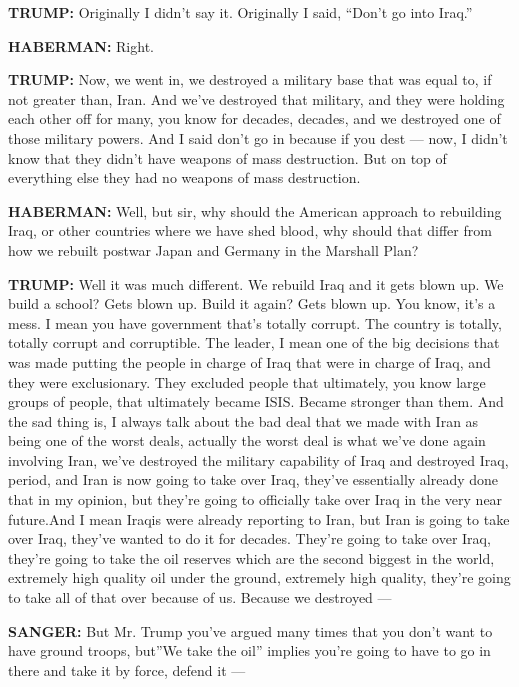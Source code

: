 \textbf{TRUMP:} Originally I didn't say it. Originally I said, ``Don't
go into Iraq.''

\textbf{HABERMAN:} Right.

\textbf{TRUMP:} Now, we went in, we destroyed a military base that was
equal to, if not greater than, Iran. And we've destroyed that military,
and they were holding each other off for many, you know for decades,
decades, and we destroyed one of those military powers. And I said don't
go in because if you dest --- now, I didn't know that they didn't have
weapons of mass destruction. But on top of everything else they had no
weapons of mass destruction.

\textbf{HABERMAN:} Well, but sir, why should the American approach to
rebuilding Iraq, or other countries where we have shed blood, why should
that differ from how we rebuilt postwar Japan and Germany in the
Marshall Plan?

\textbf{TRUMP:} Well it was much different. We rebuild Iraq and it gets
blown up. We build a school? Gets blown up. Build it again? Gets blown
up. You know, it's a mess. I mean you have government that's totally
corrupt. The country is totally, totally corrupt and corruptible. The
leader, I mean one of the big decisions that was made putting the people
in charge of Iraq that were in charge of Iraq, and they were
exclusionary. They excluded people that ultimately, you know large
groups of people, that ultimately became ISIS. Became stronger than
them. And the sad thing is, I always talk about the bad deal that we
made with Iran as being one of the worst deals, actually the worst deal
is what we've done again involving Iran, we've destroyed the military
capability of Iraq and destroyed Iraq, period, and Iran is now going to
take over Iraq, they've essentially already done that in my opinion, but
they're going to officially take over Iraq in the very near future.And I
mean Iraqis were already reporting to Iran, but Iran is going to take
over Iraq, they've wanted to do it for decades. They're going to take
over Iraq, they're going to take the oil reserves which are the second
biggest in the world, extremely high quality oil under the ground,
extremely high quality, they're going to take all of that over because
of us. Because we destroyed ---

\textbf{SANGER:} But Mr. Trump you've argued many times that you don't
want to have ground troops, but''We take the oil'' implies you're going
to have to go in there and take it by force, defend it ---

